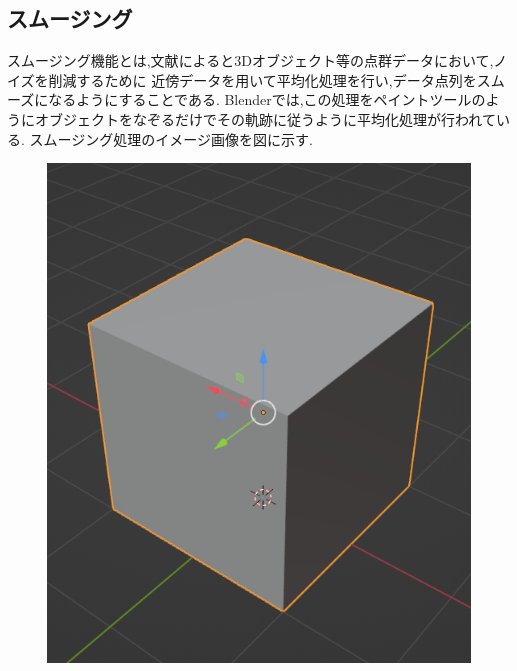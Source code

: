 \documentclass{ltjsreport}
\begin{document}
		\subsection{スムージング}
			スムージング機能とは,文献\cite{ref:7}によると3Dオブジェクト等の点群データにおいて,ノイズを削減するために
			近傍データを用いて平均化処理を行い,データ点列をスムーズになるようにすることである.
			Blenderでは,この処理をペイントツールのようにオブジェクトをなぞるだけでその軌跡に従うように平均化処理が行われている.
			スムージング処理のイメージ画像を図に示す.
			\begin{figure}[H]
			\centering
			\begin{minipage}{0.25\columnwidth}
			\centering
			\includegraphics[width = \columnwidth]{../figs/SmoothingBeforCube.png}
			\end{minipage}
			\hspace{0.04\columnwidth}
			\begin{minipage}{0.25\columnwidth}
			\centering

\end{minipage}
\end{figure}
\end{document}
